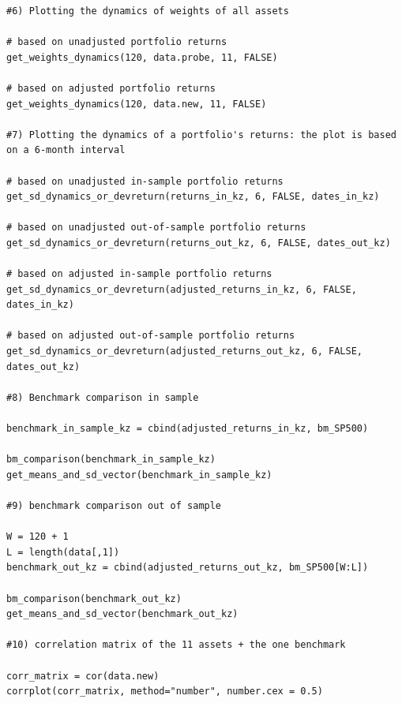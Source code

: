 \documentclass{article}
\begin{document}
\begin{lstlisting}[caption={This listing shows the entire code developed in R.}, label=code:1,frame=single]
#6) Plotting the dynamics of weights of all assets

# based on unadjusted portfolio returns
get_weights_dynamics(120, data.probe, 11, FALSE)

# based on adjusted portfolio returns
get_weights_dynamics(120, data.new, 11, FALSE)

#7) Plotting the dynamics of a portfolio's returns: the plot is based on a 6-month interval

# based on unadjusted in-sample portfolio returns
get_sd_dynamics_or_devreturn(returns_in_kz, 6, FALSE, dates_in_kz)

# based on unadjusted out-of-sample portfolio returns
get_sd_dynamics_or_devreturn(returns_out_kz, 6, FALSE, dates_out_kz)

# based on adjusted in-sample portfolio returns
get_sd_dynamics_or_devreturn(adjusted_returns_in_kz, 6, FALSE, dates_in_kz)

# based on adjusted out-of-sample portfolio returns
get_sd_dynamics_or_devreturn(adjusted_returns_out_kz, 6, FALSE, dates_out_kz)

#8) Benchmark comparison in sample 

benchmark_in_sample_kz = cbind(adjusted_returns_in_kz, bm_SP500)

bm_comparison(benchmark_in_sample_kz)
get_means_and_sd_vector(benchmark_in_sample_kz)

#9) benchmark comparison out of sample 

W = 120 + 1
L = length(data[,1])
benchmark_out_kz = cbind(adjusted_returns_out_kz, bm_SP500[W:L])

bm_comparison(benchmark_out_kz)
get_means_and_sd_vector(benchmark_out_kz)

#10) correlation matrix of the 11 assets + the one benchmark 

corr_matrix = cor(data.new)
corrplot(corr_matrix, method="number", number.cex = 0.5)

\end{lstlisting}
\end{document}
